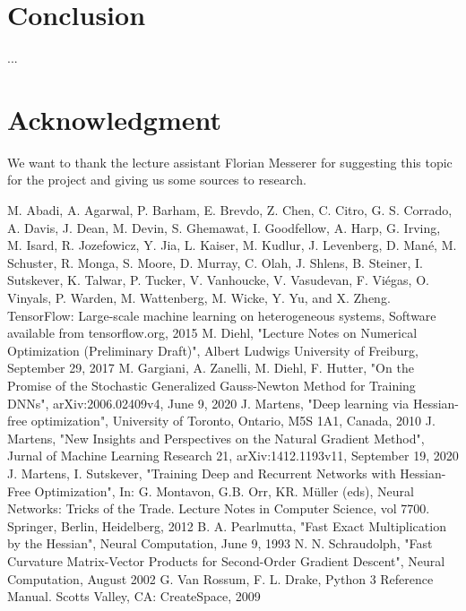 \documentclass[conference]{IEEEtran}
\begin{document}
\section{Conclusion}
...

\section*{Acknowledgment}
We want to thank the lecture assistant Florian Messerer for suggesting this topic for the project and giving us some sources to research. 


\begin{thebibliography}{00}
 M. Abadi, A. Agarwal, P. Barham, E. Brevdo,
Z. Chen, C. Citro, G. S. Corrado, A. Davis,
J. Dean, M. Devin, S. Ghemawat, I. Goodfellow,
A. Harp, G. Irving, M. Isard, R. Jozefowicz, Y. Jia,
L. Kaiser, M. Kudlur, J. Levenberg, D. Mané, M. Schuster,
R. Monga, S. Moore, D. Murray, C. Olah, J. Shlens,
B. Steiner, I. Sutskever, K. Talwar, P. Tucker,
V. Vanhoucke, V. Vasudevan, F. Viégas,
O. Vinyals, P. Warden, M. Wattenberg, M. Wicke,
Y. Yu, and X. Zheng.
TensorFlow: Large-scale machine learning on heterogeneous systems, Software available from tensorflow.org, 2015	
 M. Diehl, "Lecture Notes on Numerical Optimization (Preliminary Draft)", Albert Ludwigs University of Freiburg, September 29, 2017	
 M. Gargiani, A. Zanelli, M. Diehl, F. Hutter, "On the Promise of the Stochastic Generalized Gauss-Newton Method for Training DNNs",  arXiv:2006.02409v4, June 9, 2020 
 J. Martens, "Deep learning via Hessian-free optimization", University of Toronto, Ontario, M5S 1A1, Canada, 2010
 J. Martens, "New Insights and Perspectives on the Natural Gradient Method", Jurnal of Machine Learning Research 21, arXiv:1412.1193v11, September 19, 2020
 J. Martens, I. Sutskever, "Training Deep and Recurrent Networks with Hessian-Free Optimization", In: G. Montavon, G.B. Orr, KR. Müller (eds), Neural Networks: Tricks of the Trade. Lecture Notes in Computer Science, vol 7700. Springer, Berlin, Heidelberg, 2012
 B. A. Pearlmutta, "Fast Exact Multiplication by the Hessian", Neural Computation, June 9, 1993
 N. N. Schraudolph, "Fast Curvature Matrix-Vector Products for Second-Order
Gradient Descent", Neural Computation, August 2002
 G. Van Rossum, F. L. Drake, Python 3 Reference Manual. Scotts Valley, CA: CreateSpace, 2009
\end{thebibliography}
\end{document}
